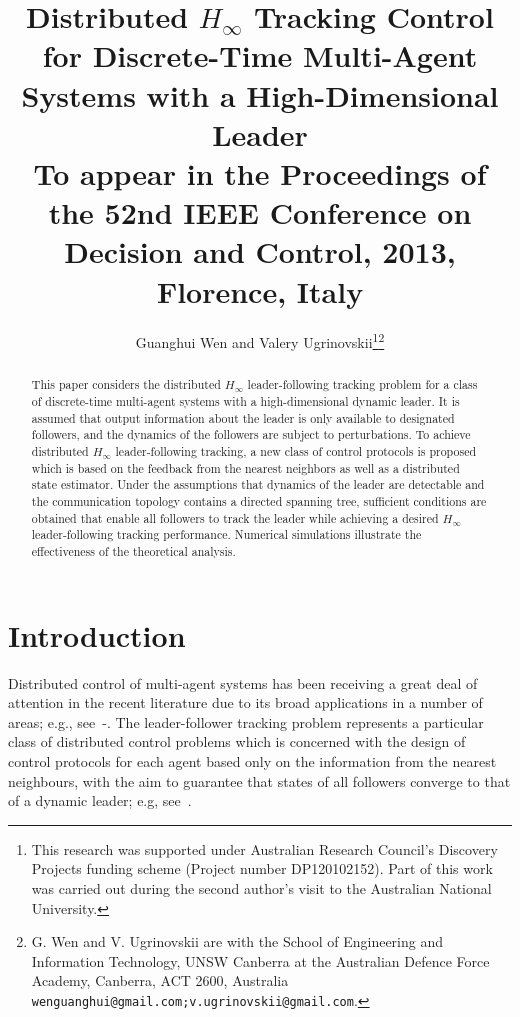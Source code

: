 \documentclass[a4paper,10pt,onecolumn]{article}
\title{Distributed $H_{\infty}$ Tracking Control for Discrete-Time
  Multi-Agent Systems with a High-Dimensional Leader\\[1cm]
\normalsize
To appear in the Proceedings of the 52nd IEEE Conference on Decision and
Control, 2013, Florence, Italy}
\author{Guanghui Wen and Valery Ugrinovskii\thanks{This research was supported under Australian Research Council's Discovery
Projects funding scheme (Project number DP120102152). Part of this work was
carried out during the second author's visit to the Australian National
University.}\thanks{G. Wen and V. Ugrinovskii are with the School of Engineering and
  Information Technology, UNSW Canberra at the Australian Defence Force Academy,
  Canberra, ACT 2600, Australia
        {\tt\small wenguanghui@gmail.com;v.ugrinovskii@gmail.com}.}}
\begin{document}
\maketitle
\thispagestyle{empty}
\pagestyle{empty}


\begin{abstract}
This paper considers the distributed $H_{\infty}$ leader-following tracking
problem for a class of discrete-time multi-agent systems with a
high-dimensional dynamic leader. It is
assumed that output information about the leader is only available to
designated followers, and the dynamics of the followers are subject to perturbations.
To achieve distributed $H_{\infty}$ leader-following tracking, a
new class of control protocols is proposed which is based on the
feedback from the nearest neighbors as well as a
 distributed state estimator. Under the
assumptions that dynamics of the leader are detectable
and the communication topology contains a directed spanning tree,
sufficient conditions are obtained that enable all followers to track the
leader while achieving a desired $H_{\infty}$ leader-following tracking
performance. Numerical simulations illustrate the
effectiveness of the theoretical analysis.
\end{abstract}


\section{Introduction}
Distributed control of multi-agent
systems has been receiving a great deal of attention in the recent
literature due to its broad applications in a number of areas; e.g.,
see~\cite{Saber-2007}-\cite{Ugrinovskii-Automatica}. The leader-follower tracking problem
represents a
particular class of distributed control problems which is concerned with
the design of control protocols for each agent based only on the
information from the nearest neighbours, with the aim to guarantee that
states of all followers converge to that of a dynamic
leader; e.g, see~\cite{Hong-2006}.
\end{document}
